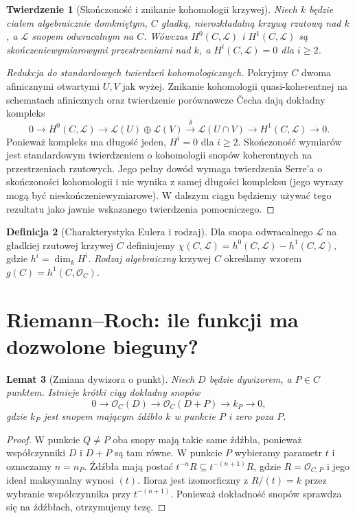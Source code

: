 \documentclass[11pt,a4paper,openany]{report}
\numberwithin{equation}{section}
\theoremstyle{plain}
\newtheorem{twierdzenie}{Twierdzenie}[section]
\newtheorem{lemat}[twierdzenie]{Lemat}
\theoremstyle{definition}
\newtheorem{definicja}[twierdzenie]{Definicja}
\theoremstyle{remark}
\begin{document}
\begin{twierdzenie}[Skończoność i znikanie kohomologii krzywej]
\label{tw:curve-coh}
Niech $k$ będzie ciałem algebraicznie domkniętym,
$C$ gładką, nierozkładalną krzywą rzutową nad $k$,
a $\mathcal L$ snopem odwracalnym na $C$.
Wówczas $H^0(C,\mathcal L)$ i $H^1(C,\mathcal L)$ są
skończeniewymiarowymi przestrzeniami nad $k$,
a $H^i(C,\mathcal L)=0$ dla $i\ge2$.
\end{twierdzenie}
\begin{proof}[Redukcja do standardowych twierdzeń kohomologicznych]
Pokryjmy $C$ dwoma afinicznymi otwartymi $U,V$
jak wyżej. Znikanie kohomologii quasi-koherentnej
na schematach afinicznych oraz twierdzenie
porównawcze Čecha dają dokładny kompleks
\[
 0\longrightarrow H^0(C,\mathcal L)
 \longrightarrow\mathcal L(U)\oplus\mathcal L(V)
 \xrightarrow{\delta}\mathcal L(U\cap V)
 \longrightarrow H^1(C,\mathcal L)\longrightarrow0.
\]
Ponieważ kompleks ma długość jeden,
$H^i=0$ dla $i\ge2$.
Skończoność wymiarów jest standardowym
twierdzeniem o kohomologii snopów koherentnych
na przestrzeniach rzutowych. Jego pełny dowód
wymaga twierdzenia Serre'a o skończoności
kohomologii i nie wynika z samej długości
kompleksu (jego wyrazy mogą być nieskończeniewymiarowe).
W dalszym ciągu będziemy używać tego rezultatu
jako jawnie wskazanego twierdzenia pomocniczego.
\end{proof}

\begin{definicja}[Charakterystyka Eulera i rodzaj]
Dla snopa odwracalnego $\mathcal L$ na gładkiej
rzutowej krzywej $C$ definiujemy
$\chi(C,\mathcal L)=h^0(C,\mathcal L)-h^1(C,\mathcal L)$,
gdzie $h^i=\dim_kH^i$. \emph{Rodzaj algebraiczny}
krzywej $C$ określamy wzorem
$g(C)=h^1(C,\mathcal O_C)$.
\end{definicja}

\section{Riemann--Roch: ile funkcji ma dozwolone bieguny?}
\label{sec:rr}

\begin{lemat}[Zmiana dywizora o punkt]
\label{lem:exact-point}
Niech $D$ będzie dywizorem, a $P\in C$ punktem.
Istnieje krótki ciąg dokładny snopów
\[
 0\longrightarrow\mathcal O_C(D)
 \longrightarrow\mathcal O_C(D+P)
 \longrightarrow k_P\longrightarrow0,
\]
gdzie $k_P$ jest snopem mającym źdźbło $k$
w punkcie $P$ i zero poza $P$.
\end{lemat}
\begin{proof}
W punkcie $Q\ne P$ oba snopy mają takie same
źdźbła, ponieważ współczynniki $D$ i $D+P$
są tam równe. W punkcie $P$ wybieramy parametr
$t$ i oznaczamy $n=n_P$. Źdźbła mają postać
$t^{-n}R\subseteq t^{-(n+1)}R$, gdzie
$R=\mathcal O_{C,P}$ i jego ideał maksymalny
wynosi $(t)$. Iloraz jest izomorficzny z
$R/(t)=k$ przez wybranie współczynnika przy
$t^{-(n+1)}$. Ponieważ dokładność snopów
sprawdza się na źdźbłach, otrzymujemy tezę.
\end{proof}
\end{document}
